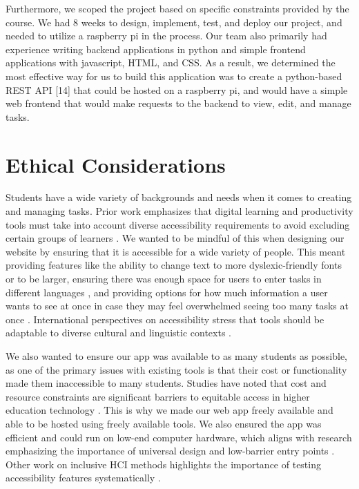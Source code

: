 \documentclass[11pt,oneside]{article}
\begin{document}
\begin{enumerate}
Furthermore, we scoped the project based on specific constraints provided by the course. We had 8 weeks to design, implement, test, and deploy our project, and needed to utilize a raspberry pi in the process. Our team also primarily had experience writing backend applications in python and simple frontend applications with javascript, HTML, and CSS. As a result, we determined the most effective way for us to build this application was to create a python-based REST API [14] that could be hosted on a raspberry pi, and would have a simple web frontend that would make requests to the backend to view, edit, and manage tasks.


\section{Ethical Considerations}
Students have a wide variety of backgrounds and needs when it comes to creating and managing tasks. Prior work emphasizes that digital learning and productivity tools must take into account diverse accessibility requirements to avoid excluding certain groups of learners \citep{seale2013learning}. We wanted to be mindful of this when designing our website by ensuring that it is accessible for a wide variety of people. This meant providing features like the ability to change text to more dyslexic-friendly fonts or to be larger, ensuring there was enough space for users to enter tasks in different languages \citep{al2016universal}, and providing options for how much information a user wants to see at once in case they may feel overwhelmed seeing too many tasks at once \citep{spina2019wcag}. International perspectives on accessibility stress that tools should be adaptable to diverse cultural and linguistic contexts \citep{world2011world}.

We also wanted to ensure our app was available to as many students as possible, as one of the primary issues with existing tools is that their cost or functionality made them inaccessible to many students. Studies have noted that cost and resource constraints are significant barriers to equitable access in higher education technology \citep{selwyn2021education}. This is why we made our web app freely available and able to be hosted using freely available tools. We also ensured the app was efficient and could run on low-end computer hardware, which aligns with research emphasizing the importance of universal design and low-barrier entry points \citep{rose2002teaching}. Other work on inclusive HCI methods highlights the importance of testing accessibility features systematically \citep{lazar2017research}.


\end{enumerate}
\end{document}
